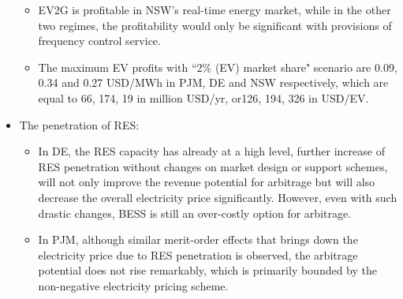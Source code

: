 \begin{itemize}
\begin{itemize}
		\item EV2G is profitable in NSW's real-time energy market, while in the other two regimes, the profitability would only be significant with provisions of frequency control service.
		\item The maximum EV profits with ``2\% (EV) market share" scenario are 0.09, 0.34 and 0.27 USD/MWh in PJM, DE and NSW respectively, which are equal to 66, 174, 19 in million USD/yr, or126, 194, 326 in USD/EV.
	\end{itemize}
	\item The penetration of RES:
	\begin{itemize}
		\item In DE, the RES capacity has already at a high level, further increase of RES penetration without changes on market design or support schemes, will not only improve the revenue potential for arbitrage but will also decrease the overall electricity price significantly. However, even with such drastic changes, BESS is still an over-costly option for arbitrage.
		\item In PJM, although similar merit-order effects that brings down the electricity price due to RES penetration is observed, the arbitrage potential does not rise remarkably, which is primarily bounded by the non-negative electricity pricing scheme. 
	\end{itemize}
\end{itemize}

